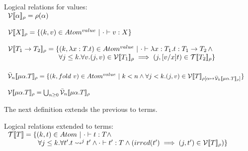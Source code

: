\begin{definition}
  \label{def:logical_relations}
  Logical relations for values: \\
  \begin{math}
    \begin{array}{lllll}
      \vinterp{\alpha}_\rho = \rho(\alpha) \\
      & \\
      \vinterp{X}_\rho =  \{ (k,v) \in Atom^{value}\ |\ \cdot \vdash v : X \} \\
      & \\
      \vinterp{T_1 \to T_2}_\rho = \{ (k, \lambda x:T.t) \in Atom^{value}\ |\ 
      \cdot \vdash \lambda x:T_1.t : T_1 \to T_2 \,\land \\
      \,\,\,\,\,\,\,\,\,\,\,\,\,\,\,
      \,\,\,\,\,\,\,\,\,\,\,\,\,\,\,
      \,\,\,\,\,\,\,\,\,\,\,\,\,\,
      \forall j \leq k.\forall v.(j, v) \in \vinterp{T_1}_\rho \implies 
              (j, [v/x]t) \in \tinterp{T_2}_{\rho} \}\\
    \end{array}
  \end{math}\\
  \ \\
  \begin{math}
    \begin{array}{llllllll}
      \vbinterp{n}{\mu \alpha.T}_\rho = \{ (k,fold\ v) \in Atom^{value}\ |\ 
        k < n \land \forall j < k.(j,v) \in 
        \vinterp{T}_{\rho[\alpha \mapsto \vbinterp{k}{\mu \alpha.T}_\rho]}\}\\
      & \\
      \vinterp{\mu \alpha.T}_\rho = \bigcup_{n \geq 0} \vbinterp{n}{\mu \alpha.T}_\rho
    \end{array}
  \end{math}
\end{definition}
\noindent
The next definition extends the previous to terms.
\begin{definition}
  \label{def:lr_extended_to_terms}
    Logical relations extended to terms:\\
  \begin{math}
    \begin{array}{lll}
      \mathcal{T}[\negthinspace[T]\negthinspace] = \{ (k,t) \in Atom\ |\ \cdot \vdash t:T \land \\
      \,\,\,\,\,\,\,\,\,\,\,\,\,\,\,
      \,\,\,\,\,\,\,\,\,\,\,
      \forall j \leq k.\forall t'.t \rightsquigarrow^j t' \land \cdot \vdash t':T \land 
      (irred(t') \implies (j,t') \in \mathcal{V}[\negthinspace[T]\negthinspace]_\rho) \}
    \end{array}
  \end{math}
\end{definition}
